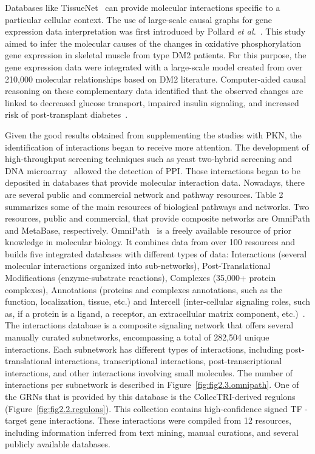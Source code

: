Databases like TissueNet~\cite{RN137} can provide molecular interactions specific to a particular cellular context. The use of large-scale causal graphs for gene expression data interpretation was first introduced by Pollard \textit{et al.}~\cite{RN131, RN135}. This study aimed to infer the molecular causes of the changes in oxidative phosphorylation gene expression in skeletal muscle from type \gls{DM2} patients. For this purpose, the gene expression data were integrated with a large-scale model created from over 210,000 molecular relationships based on \gls{DM2} literature. 
Computer-aided causal reasoning on these complementary data identified that the observed changes are linked to decreased glucose transport, impaired insulin signaling, and increased risk of post-transplant diabetes~\cite{RN131}.


Given the good results obtained from supplementing the studies with PKN, the identification of interactions began to receive more attention. 
The development of high-throughput screening techniques such as yeast two-hybrid screening and DNA microarray~\cite{RN138} allowed the detection of PPI. 
Those interactions began to be deposited in databases that provide molecular interaction data. 
Nowadays, there are several public and commercial network and pathway resources. Table 2 summarizes some of the main resources of biological pathways and networks. 
Two resources, public and commercial, that provide composite networks are OmniPath and MetaBase, respectively. OmniPath~\cite{RN91} is a freely available resource of prior knowledge in molecular biology. 
It combines data from over 100 resources and builds five integrated databases with different types of data: Interactions (several molecular interactions organized into sub-networks), Post-Translational Modifications (enzyme-substrate reactions), Complexes (35,000+ protein complexes), Annotations (proteins and complexes annotations, such as the function, localization, tissue, etc.) and Intercell (inter-cellular signaling roles, such as, if a protein is a ligand, a receptor, an extracellular matrix component,  etc.)~\cite{RN91}. 
The interactions database is a composite signaling network that offers several manually curated subnetworks, encompassing a total of 282,504 unique interactions. 
Each subnetwork has different types of interactions, including post-translational interactions, transcriptional interactions, post-transcriptional interactions, and other interactions involving small molecules. 
The number of interactions per subnetwork is described in Figure~\ref{fig:fig2.3.omnipath}. One of the GRNs that is provided by this database is the CollecTRI-derived regulons~\cite{RN145} (Figure~\ref{fig:fig2.2.regulons}). 
This collection contains high-confidence signed \gls{TF} - target gene interactions. 
These interactions were compiled from 12 resources, including information inferred from text mining, manual curations, and several publicly available databases.

